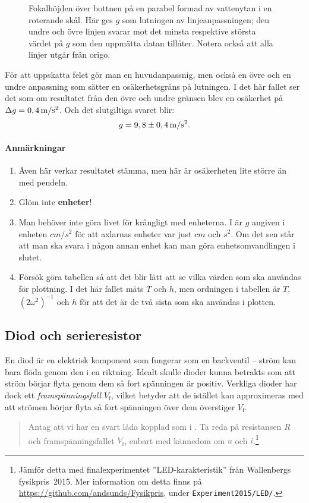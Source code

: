 \documentclass[11pt,a4paper, swedish
]{article}
\begin{document}
\begin{figure}
\centering

\caption{Fokalhöjden över bottnen på en parabel formad av vattenytan i
en roterande skål. Här ges $g$ som lutningen av linjeanpassningen; den
undre och övre linjen svarar mot det minsta respektive största värdet
på $g$ som den uppmätta datan tillåter. Notera också att alla linjer
utgår från origo. }
\label{fig:vattenparabel}
\end{figure}

För att uppskatta felet gör man en huvudanpassnig, men också en övre
och en undre anpassning som sätter en osäkerhetsgräns på lutningen. I
det här fallet ser det som om resultatet från den övre och undre
gränsen blev en osäkerhet på $\Delta{g}=\unit[0,4]{m/s^2}$. Och det
slutgiltiga svaret blir:
\[g=\unit[9,8\pm0,4]{m/s^2}.\]

\paragraph{Anmärkningar}
\begin{enumerate}
\item Även här verkar resultatet stämma, men här är osäkerheten lite
  större än med pendeln. 
\item Glöm inte \textbf{enheter}!
\item Man behöver inte göra livet för krångligt med enheterna. I
   är $g$ angiven i enheten $\unit{cm/s^2}$
  för att axlarnas enheter var just $\unit{cm}$ och $\unit{s^2}$. Om
  det sen står att man ska svara i någon annan enhet kan man göra
  enhetsomvandlingen i slutet.
\item Försök göra tabellen så att det blir lätt att se vilka värden
  som ska användas för plottning. I det här fallet mäts $T$ och $h$,
  men ordningen i tabellen är $T$, $(2\omega^2)^{-1}$ och $h$ för att
  det är de två sista som ska användas i plotten. 
\end{enumerate}


\subsection{Diod och serieresistor}
\newcommand{\Vf}{\ensuremath{}V_\text{f}}

En diod är en elektrisk komponent som fungerar som en backventil --
ström kan bara flöda genom den i en riktning. Idealt skulle dioder
kunna betrakts som att ström börjar flyta genom dem så fort spänningen
är positiv. 
Verkliga dioder har dock ett \emph{framspänningsfall} $\Vf$,
vilket betyder att de istället kan approximeras med att strömen börjar
flyta så fort spänningen över dem överstiger $\Vf$.
\begin{quote}
Antag att vi har en svart låda kopplad som i
.
Ta reda på resistansen $R$ och framspänningsfallet
$\Vf$, enbart med kännedom om $u$ och $i$.\footnote{Jämför
  detta med finalexperimentet ''LED-karakteristik'' från Wallenbergs
  fysikpris~2015. Mer information om detta finns på 
  \url{https://github.com/andsunds/Fysikpris}, under
  \texttt{Experiment2015/LED/}. } 
\end{quote}
\end{document}
